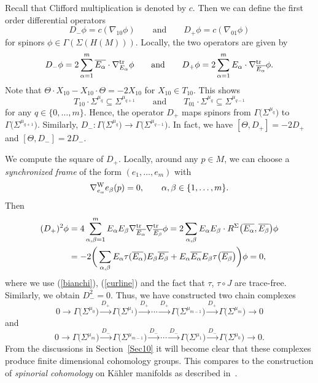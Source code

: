 \documentclass[pdftex]{sigma}
\numberwithin{equation}{section}
\begin{document}
Recall that Clifford multiplication is denoted by $c$. Then we can define the first order differential operators
\[
D_-\phi = c(\nabla_{10}\phi)\qquad \mbox{and}\qquad D_+\phi = c(\nabla_{01}\phi)
\]
for spinors $\phi\in\Gamma(\Sigma(H(M)))$. Locally, the two operators are given by
\[
D_-\phi = 2\sum_{\alpha=1}^m \overline{E_\alpha}\cdot\nabla^{\rm tr}_{E_\alpha}\phi\qquad\mbox{and}\qquad
D_+\phi = 2\sum_{\alpha=1}^m E_\alpha\cdot \nabla^{\rm tr}_{\overline{E_\alpha}}\phi.
\]
Note that $\Theta\cdot X_{10}- X_{10}\cdot \Theta = -2X_{10}$ for $X_{10}\in T_{10}$. This shows
\[ T_{10}\cdot \Sigma^{\mu_q} \subseteq \Sigma^{\mu_{q+1}}\qquad\mbox{and}\qquad T_{01}\cdot \Sigma^{\mu_q} \subseteq \Sigma^{\mu_{q-1}}\]
for any $q\in\{0,\dots,m\}$. Hence, the operator $D_+$ maps spinors from $\Gamma\big(\Sigma^{\mu_{q}}\big)$ to $\Gamma\big(\Sigma^{\mu_{q+1}}\big)$.
Similarly, $D_-\colon \Gamma\big(\Sigma^{\mu_{q}}\big)\to\Gamma\big(\Sigma^{\mu_{q-1}}\big)$.
In fact, we have $[\Theta,D_+]=-2D_+$ and $[\Theta,D_-]= 2D_-$.

We compute the square of $D_+$. Locally, around any $p\in M$, we can choose a {\em synchronized frame} of the form $(e_1,\dots,e_m)$
with
\[
\nabla^{\rm W}_{e_\alpha}e_\beta(p) = 0,\qquad \alpha,\beta\in\{1,\dots,m\}.
\]
Then
\begin{align*}
(D_+)^2\phi &=
4\sum_{\alpha,\beta=1}^m E_\alpha E_\beta\nabla^{\rm tr}_{\overline{E_\alpha}}\nabla^{\rm tr}_{\overline{E_\beta}}\phi =
2\sum_{\alpha,\beta} E_\alpha E_\beta\cdot R^{\Sigma}\big(\overline{E_\alpha},\overline{E_\beta}\big)\phi\\
&= -2\bigg( \sum_{\alpha,\beta} E_\alpha\tau(\overline{E_\alpha})E_\beta\overline{E_\beta}+ E_\alpha\overline{E_\alpha}E_\beta\tau\big(\overline{E_\beta}\big) \bigg)\phi = 0,
\end{align*}
where we use (\ref{bianchi}), (\ref{curline}) and the fact that $\tau$, $\tau\circ J$ are trace-free.
Similarly, we obtain $D_-^2=0$. Thus, we have constructed two chain complexes
\begin{equation}\label{spincpx}
0\to \Gamma\big(\Sigma^{\mu_0}\big)\stackrel{D_+}{\longrightarrow}\Gamma\big(\Sigma^{\mu_1}\big)\stackrel{D_+}{\longrightarrow} \cdots\stackrel{D_+}{\longrightarrow}\Gamma\big(\Sigma^{\mu_{m-1}}\big)
\stackrel{D_+}{\longrightarrow}\Gamma\big(\Sigma^{\mu_m}\big)\to 0
\end{equation}
and
\[
0\to \Gamma\big(\Sigma^{\mu_m}\big)\stackrel{D_-}{\longrightarrow} \Gamma\big(\Sigma^{\mu_{m-1}}\big)\stackrel{D_-}{\longrightarrow}\cdots\stackrel{D_-}{\longrightarrow}\Gamma\big(\Sigma^{\mu_{1}}\big)
\stackrel{D_-}{\longrightarrow}\Gamma\big(\Sigma^{\mu_0}\big)\to 0.
\]
From the discussions in Section~\ref{Sec10} it will become clear that these complexes produce finite dimensional cohomology groups.
This compares to the construction of {\em spinorial cohomology} on K\"ahler manifolds as described in~\cite{Mic}.
\end{document}
